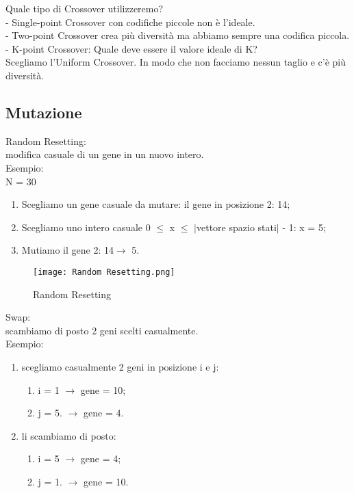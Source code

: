 \documentclass[10pt,a4paper]{article}
\begin{document}
    Quale tipo di Crossover utilizzeremo?\\
    - Single-point Crossover con codifiche piccole non è l’ideale.\\
    - Two-point Crossover crea più diversità ma abbiamo sempre una codifica piccola.\\
    - K-point Crossover: Quale deve essere il valore ideale di K?\\
    Scegliamo l’Uniform Crossover. In modo che non facciamo nessun taglio 
    e c’è più diversità.\\
    
    \subsection{Mutazione}
    \label{Mutazione}
    Random Resetting:\\
    modifica casuale di un gene in un nuovo intero.\\
    Esempio:\\
    N = 30\\
    \begin{enumerate}
      \item Scegliamo un gene casuale da mutare: il gene in posizione 2: 14;
      \item Scegliamo uno intero casuale 0 $\leq$ x $\leq$ $\mid$vettore spazio stati$\mid$ - 1: x = 5;
      \item Mutiamo il gene 2: 14$ \rightarrow$ 5.
    \end{enumerate}
    \begin{figure}[h!]
      \centering
      \caption{Random Resetting}
      \texttt{[image: Random Resetting.png]}
      \label{Random Resetting}
    \end{figure}
    
    Swap:\\
    scambiamo di posto 2 geni scelti casualmente.\\
    Esempio:\\
    \begin{enumerate}
    	\item scegliamo casualmente 2 geni in posizione i e j: 
    	\begin{enumerate}
    		\item i = 1 $\rightarrow$ gene =  10;
    		\item j = 5. $\rightarrow$ gene = 4.
    	\end{enumerate}
    	\item li scambiamo di posto:
    	\begin{enumerate}
    		\item i = 5 $\rightarrow$ gene = 4;
    		\item j = 1. $\rightarrow$ gene = 10.
    	\end{enumerate}
    \end{enumerate}
    
\end{document}
